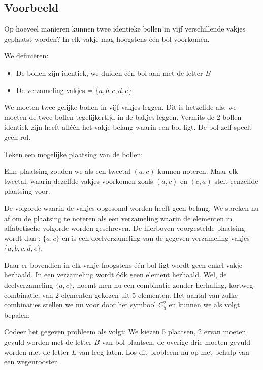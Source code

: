 \documentclass[12pt,twoside]{article}
\begin{document}
\begin{theorie}

\subsection{Voorbeeld}

Op hoeveel manieren kunnen twee identieke bollen in vijf verschillende vakjes geplaatst worden? In elk vakje mag hoogstens één bol voorkomen.

We definiëren:
\begin{itemize}
  \item De bollen zijn identiek, we duiden één bol aan met de letter $B$
  \item De verzameling vakjes = $\{a, b, c, d, e\}$
\end{itemize}

We moeten twee gelijke bollen in vijf vakjes leggen. Dit is hetzelfde als: we moeten de twee bollen tegelijkertijd in de bakjes leggen. Vermits de 2 bollen identiek zijn heeft alléén het vakje belang waarin een bol ligt. De bol zelf speelt geen rol.

Teken een mogelijke plaatsing van de bollen:

Elke plaatsing zouden we als een tweetal $(a, c)$ kunnen noteren. Maar elk tweetal, waarin dezelfde vakjes voorkomen zoals $(a, c)$ en $(c, a)$ stelt eenzelfde plaatsing voor.

De volgorde waarin de vakjes opgesomd worden heeft geen belang. We spreken nu
af om de plaatsing te noteren als een verzameling waarin de elementen in
alfabetische volgorde worden geschreven. De hierboven voorgestelde plaatsing
wordt dan : $\{a, c\}$ en is een deelverzameling van de gegeven verzameling vakjes $\{a, b, c, d, e\}$.

Daar er bovendien in elk vakje hoogstens één bol ligt wordt geen enkel vakje
herhaald. In een verzameling wordt óók geen element herhaald. Wel, de
deelverzameling $\{a, c\}$, noemt men nu een combinatie zonder herhaling, kortweg combinatie, van 2 elementen gekozen uit 5 elementen.
Het aantal van zulke combinaties stellen we nu voor door het symbool $C^2_5$ en kunnen we als volgt bepalen:

Codeer het gegeven probleem als volgt: We kiezen 5 plaatsen, 2 ervan moeten gevuld worden met de letter $B$ van bol plaatsen, de overige drie moeten gevuld worden met de letter $L$ van leeg laten. Los dit probleem nu op met behulp van een wegenrooster.\\
\ruitjes{4cm}


\end{theorie}
\end{document}
